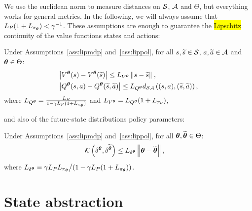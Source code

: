 %
\noindent We use the euclidean norm to measure distances on $\mathcal{S}$, $\mathcal{A}$ and $\Theta$, but everything works for general metrics.
In the following, we will always assume that ${L_{P}(1+L_{\pi_{\boldsymbol{\theta}}}) < \gamma^{-1}}$.
These assumptions are enough to guarantee the \hl{Lipschitz} continuity of the value functions \wrt states and actions:
%
\begin{lemma}\label{lem:lipval}
	Under Assumptions~\ref{ass:lipmdp} and~\ref{ass:lippol}, for all $s,\widetilde{s}\in\mathcal{S}$, $a,\widetilde{a}\in\mathcal{A}$ and $\boldsymbol{\theta}\in\Theta$:
	\begin{align}
	&\left|V^{\boldsymbol{\theta}}(s) - V^{\boldsymbol{\theta}}(\widetilde{s})\right| \leq L_{V^{\boldsymbol{\theta}}}\left\|s-\widetilde{s}\right\|_{}, \\
	&\left|Q^{\boldsymbol{\theta}}(s,a) - Q^{\boldsymbol{\theta}}(\widetilde{s},\widetilde{a})\right| \leq L_{Q^{\boldsymbol{\theta}}}d_{\mathcal{S}\mathcal{A}}\left((s,a),(\widetilde{s},\widetilde{a})\right),
	\end{align}
	where $L_{Q^{\boldsymbol{\theta}}} = \frac{L_{R}}{1-\gamma L_{P}(1+L_{\pi_{\boldsymbol{\theta}}})}$ and $L_{V^{\boldsymbol{\theta}}} = L_{Q^{\boldsymbol{\theta}}}(1+L_{\pi_{\boldsymbol{\theta}}})$,
\end{lemma}
%
\noindent and also of the future-state distributions \wrt policy parameters:
%
\begin{lemma}\label{lem:lipfut}
	Under Assumptions~\ref{ass:lipmdp} and~\ref{ass:lippol}, for all $\boldsymbol{\theta},\widetilde{\boldsymbol{\theta}}\in\Theta$:
	\begin{align}
	&\mathcal{K}\left(\delta^{\boldsymbol{\theta}},\delta^{\widetilde{\boldsymbol{\theta}}}\right) \leq L_{\delta^{\boldsymbol{\theta}}}\left\|\boldsymbol{\theta}-\widetilde{\boldsymbol{\theta}}\right\|_{},
	\end{align}
	where $L_{\delta^{\boldsymbol{\theta}}} = {\gamma L_{P}L_{\pi_{\boldsymbol{\theta}}}}\big/{\left(1-\gamma L_{P}(1+L_{\pi_{\boldsymbol{\theta}}})\right)}$.
\end{lemma}

\section{State abstraction} \label{sec:stdisc}

